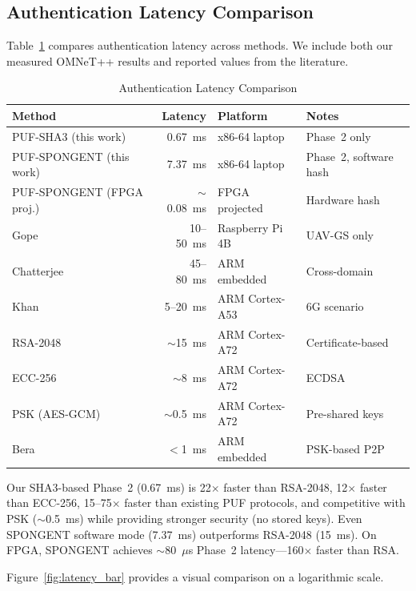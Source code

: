 \documentclass[11pt,a4paper]{article}
\begin{document}
\subsection{Authentication Latency Comparison}

Table~\ref{tab:latency_comparison} compares authentication latency across methods. We include both our measured OMNeT++ results and reported values from the literature.

\begin{table}[H]
\centering
\caption{Authentication Latency Comparison}
\label{tab:latency_comparison}
\begin{tabular}{@{}lrlp{3cm}@{}}
\toprule
\textbf{Method} & \textbf{Latency} & \textbf{Platform} & \textbf{Notes} \\
\midrule
PUF-SHA3 (this work) & 0.67~ms & x86-64 laptop & Phase~2 only \\
PUF-SPONGENT (this work) & 7.37~ms & x86-64 laptop & Phase~2, software hash \\
PUF-SPONGENT (FPGA proj.) & $\sim$0.08~ms & FPGA projected & Hardware hash \\
Gope~\cite{puf_lightweight_uav} & 10--50~ms & Raspberry Pi 4B & UAV-GS only \\
Chatterjee~\cite{puf_uav_cross_domain} & 45--80~ms & ARM embedded & Cross-domain \\
Khan~\cite{puf_6g_uav} & 5--20~ms & ARM Cortex-A53 & 6G scenario \\
RSA-2048 & $\sim$15~ms & ARM Cortex-A72 & Certificate-based \\
ECC-256 & $\sim$8~ms & ARM Cortex-A72 & ECDSA \\
PSK (AES-GCM) & $\sim$0.5~ms & ARM Cortex-A72 & Pre-shared keys \\
Bera~\cite{peer2peer_auth} & $<$1~ms & ARM embedded & PSK-based P2P \\
\bottomrule
\end{tabular}
\end{table}

Our SHA3-based Phase~2 (0.67~ms) is 22$\times$ faster than RSA-2048, 12$\times$ faster than ECC-256, 15--75$\times$ faster than existing PUF protocols, and competitive with PSK ($\sim$0.5~ms) while providing stronger security (no stored keys). Even SPONGENT software mode (7.37~ms) outperforms RSA-2048 (15~ms). On FPGA, SPONGENT achieves $\sim$80~$\mu$s Phase~2 latency---160$\times$ faster than RSA.

Figure~\ref{fig:latency_bar} provides a visual comparison on a logarithmic scale.
\end{document}
